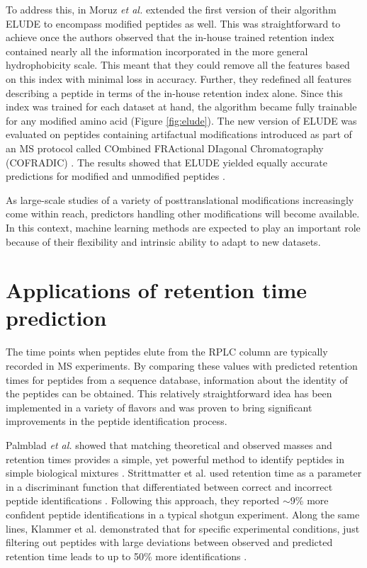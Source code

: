 \documentclass[a4paper]{article}
\begin{document}
To address this, in Moruz {\em et al.}\cite{elude2} extended the first
version of their algorithm {\sc ELUDE} to encompass modified peptides
as well. This was straightforward to achieve once the authors observed
that the in-house trained retention index contained nearly all the
information incorporated in the more general hydrophobicity scale.
This meant that they could remove all the features based on this index
with minimal loss in accuracy. Further, they redefined all features
describing a peptide in terms of the in-house retention index alone.
Since this index was trained for each dataset at hand, the algorithm
became fully trainable for any modified amino acid (Figure
\ref{fig:elude}). The new version of {\sc ELUDE} was evaluated on
peptides containing artifactual modifications introduced as part of an
MS protocol called COmbined FRActional DIagonal Chromatography
(COFRADIC) \cite{Gevaert2002}. The results showed that {\sc ELUDE}
yielded equally accurate predictions for modified and unmodified
peptides \cite{elude2}.

As large-scale studies of a variety of posttranslational modifications
increasingly come within reach, predictors
handling other modifications will become available. In this context,
machine learning methods are expected to play an important role
because of their flexibility and intrinsic ability to adapt to new
datasets.


\section{\label{sec:app}Applications of retention time prediction}

The time points when peptides elute from the RPLC column are typically
recorded in MS experiments. By comparing these values with predicted
retention times for peptides from a sequence database, information
about the identity of the peptides can be obtained. This relatively
straightforward idea has been implemented in a variety of flavors and
was proven to bring significant improvements in the peptide
identification process.


Palmblad {\em et al.} showed that matching theoretical and observed masses
and retention times provides a simple, yet powerful method to identify
peptides in simple biological
mixtures \cite{palmblad2002prediction}. Strittmatter et al. used
retention time as a parameter in a discriminant function that
differentiated between correct and incorrect peptide
identifications \cite{Strittmatter2004}. Following this approach, they
reported $\sim$9\% more confident peptide identifications in a typical
shotgun experiment. Along the same lines, Klammer et al. demonstrated
that for specific experimental conditions, just filtering out peptides
with large deviations between observed and predicted retention time
leads to up to 50\% more
identifications \cite{klammer2007improving}. 
\end{document}
